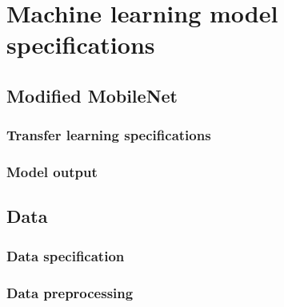 \chapter{Machine learning model specifications}
\label{chap:ch4}

\section{Modified MobileNet}
\label{sec:ch4sec1}

\subsection{Transfer learning specifications}
\label{sec:ch4sec1subsec1}

\subsection{Model output}
\label{sec:ch4sec1subsec2}

\section{Data}
\label{sec:ch4sec2}

\subsection{Data specification}
\label{sec:ch4sec2subsec1}

\subsection{Data preprocessing}
\label{sec:ch4sec2subsec2}